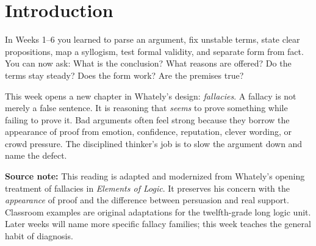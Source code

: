 \documentclass[12pt]{article}
\newcommand{\focusbox}[1]{\par\vspace{0.4em}\noindent\begingroup\setlength{\fboxsep}{6pt}\colorbox{gray!12}{\begin{minipage}{\dimexpr\linewidth-2\fboxsep\relax}#1\end{minipage}}\endgroup\par\vspace{0.5em}}
\begin{document}
\section*{Introduction}
In Weeks 1--6 you learned to parse an argument, fix unstable terms, state clear propositions, map a syllogism, test formal validity, and separate form from fact. You can now ask: What is the conclusion? What reasons are offered? Do the terms stay steady? Does the form work? Are the premises true?

This week opens a new chapter in Whately's design: \textit{fallacies}. A fallacy is not merely a false sentence. It is reasoning that \textit{seems} to prove something while failing to prove it. Bad arguments often feel strong because they borrow the appearance of proof from emotion, confidence, reputation, clever wording, or crowd pressure. The disciplined thinker's job is to slow the argument down and name the defect.

\focusbox{\textbf{Source note:} This reading is adapted and modernized from Whately's opening treatment of fallacies in \textit{Elements of Logic}. It preserves his concern with the \textit{appearance} of proof and the difference between persuasion and real support. Classroom examples are original adaptations for the twelfth-grade long logic unit. Later weeks will name more specific fallacy families; this week teaches the general habit of diagnosis.}
\end{document}
